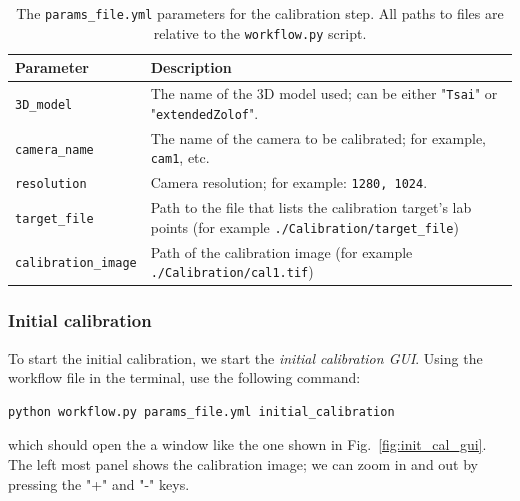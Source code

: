 \documentclass[10pt,a4paper]{article}
\begin{document}
\begin{table}
	\centering
	\caption{The \texttt{params\_file.yml} parameters for the calibration step. All paths to files are relative to the \texttt{workflow.py} script. \label{tab:cal_paramsfile}}
	\begin{tabular}{l m{10cm}}
		\hline
		Parameter & Description\\[.2cm]
		\hline
		
		\texttt{3D\_model} & The name of the 3D model used; can be either "\texttt{Tsai}" or "\texttt{extendedZolof}". \\[.2cm]
		
		\texttt{camera\_name} & The name of the camera to be calibrated; for example, \texttt{cam1}, etc. \\[.2cm]
		
		\texttt{resolution} & Camera resolution; for example: \texttt{1280, 1024}. \\[.2cm]
		
		\texttt{target\_file} & Path to the file that lists the calibration target's lab points (for example \texttt{./Calibration/target\_file}) \\[.2cm]
		
		\texttt{calibration\_image} & Path of the calibration image (for example \texttt{./Calibration/cal1.tif})\\[.2cm]
		
		\hline
	\end{tabular}
\end{table}





\subsubsection{Initial calibration}\label{sec:init_calibration}


To start the initial calibration, we start the \textit{initial calibration GUI}. Using the workflow file in the terminal, use the following command:
%
\begin{verbatim}
python workflow.py params_file.yml initial_calibration
\end{verbatim} 
%
which should open the a window like the one shown in Fig.~\ref{fig:init_cal_gui}. The left most panel shows the calibration image; we can zoom in and out by pressing the "+" and "-" keys. 
\end{document}
